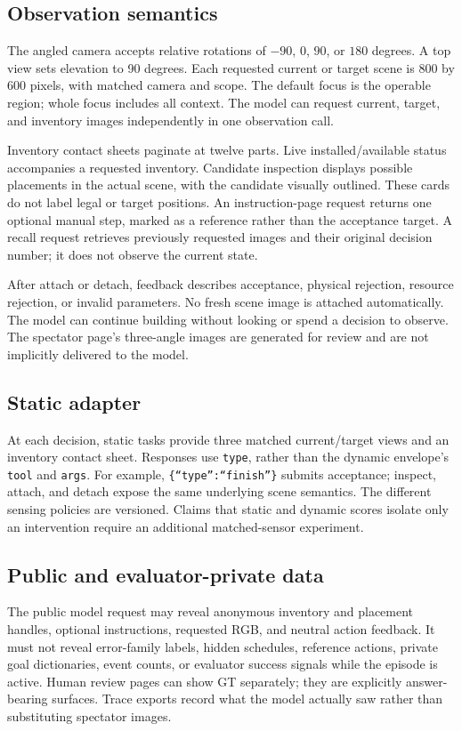 \documentclass[10pt,twocolumn,letterpaper]{article}
\begin{document}
\subsection{Observation semantics}
The angled camera accepts relative rotations of $-90$, $0$, $90$, or $180$ degrees. A top view sets elevation to 90 degrees. Each requested current or target scene is 800 by 600 pixels, with matched camera and scope. The default focus is the operable region; whole focus includes all context. The model can request current, target, and inventory images independently in one observation call.

Inventory contact sheets paginate at twelve parts. Live installed/available status accompanies a requested inventory. Candidate inspection displays possible placements in the actual scene, with the candidate visually outlined. These cards do not label legal or target positions. An instruction-page request returns one optional manual step, marked as a reference rather than the acceptance target. A recall request retrieves previously requested images and their original decision number; it does not observe the current state.

After attach or detach, feedback describes acceptance, physical rejection, resource rejection, or invalid parameters. No fresh scene image is attached automatically. The model can continue building without looking or spend a decision to observe. The spectator page's three-angle images are generated for review and are not implicitly delivered to the model.

\subsection{Static adapter}
At each decision, static tasks provide three matched current/target views and an inventory contact sheet. Responses use \texttt{type}, rather than the dynamic envelope's \texttt{tool} and \texttt{args}. For example, \texttt{\{``type'':``finish''\}} submits acceptance; inspect, attach, and detach expose the same underlying scene semantics. The different sensing policies are versioned. Claims that static and dynamic scores isolate only an intervention require an additional matched-sensor experiment.

\subsection{Public and evaluator-private data}
The public model request may reveal anonymous inventory and placement handles, optional instructions, requested RGB, and neutral action feedback. It must not reveal error-family labels, hidden schedules, reference actions, private goal dictionaries, event counts, or evaluator success signals while the episode is active. Human review pages can show GT separately; they are explicitly answer-bearing surfaces. Trace exports record what the model actually saw rather than substituting spectator images.
\end{document}
